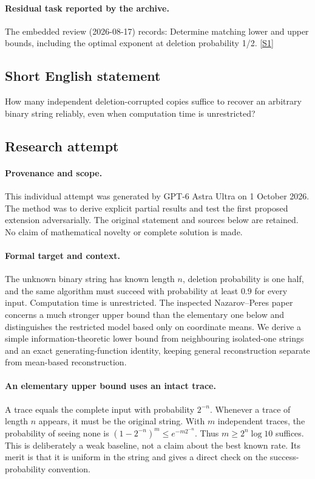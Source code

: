 \documentclass[11pt,a4paper]{article}
\newcommand{\sref}[2]{\hyperlink{source:#1:#2}{[S#2]}}
\begin{document}
\paragraph{Residual task reported by the archive.}

The embedded review (2026-08-17) records: Determine matching lower and upper bounds, including the optimal exponent at deletion probability 1/2. \sref{statement}{1}

\subsection{Short English statement}

How many independent deletion-corrupted copies suffice to recover an arbitrary binary string reliably, even when computation time is unrestricted?

\subsection{Research attempt}

\paragraph{Provenance and scope.}
This individual attempt was generated by GPT-6 Astra Ultra on 1 October 2026. The method was to derive explicit partial results and test the first proposed extension adversarially. The original statement and sources below are retained. No claim of mathematical novelty or complete solution is made.

\paragraph{Formal target and context.}
The unknown binary string has known length $n$, deletion probability is one half, and the same algorithm must succeed with probability at least $0.9$ for every input. Computation time is unrestricted. The inspected Nazarov--Peres paper concerns a much stronger upper bound than the elementary one below and distinguishes the restricted model based only on coordinate means. We derive a simple information-theoretic lower bound from neighbouring isolated-one strings and an exact generating-function identity, keeping general reconstruction separate from mean-based reconstruction.

\paragraph{An elementary upper bound uses an intact trace.}
A trace equals the complete input with probability $2^{-n}$. Whenever a trace of length $n$ appears, it must be the original string. With $m$ independent traces, the probability of seeing none is $(1-2^{-n})^m\leq e^{-m2^{-n}}$. Thus $m\geq2^n\log10$ suffices. This is deliberately a weak baseline, not a claim about the best known rate. Its merit is that it is uniform in the string and gives a direct check on the success-probability convention.
\end{document}
